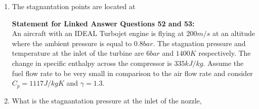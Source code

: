\documentclass[journal]{IEEEtran}
\begin{document}
\begin{enumerate}
\begin{enumerate}
\begin{multicols}{2}
    \end{multicols}
\end{enumerate}
\item The stagnantation points are located at
\begin{enumerate}
\end{enumerate}
\textbf{Statement for Linked Answer Questions 52 and 53:}\\
 An aircraft with an IDEAL Turbojet engine is flying at $200 m/s$ at an altitude where the ambient pressure is equal to $0.8 bar$. The stagnation pressure and temperature at the inlet of the turbine are $6 bar$ and $1400 K$ respectively. The change in specific enthalpy across the compressor is $335 kJ/kg$. Assume the fuel flow rate to be very small in comparison to the air flow rate and consider $C_p = 1117 J/kgK$ and $\gamma = 1.3$.
\item What is the stagnantation pressure at the inlet of the nozzle,
\begin{enumerate}
\end{enumerate}

\end{enumerate}
\end{document}
